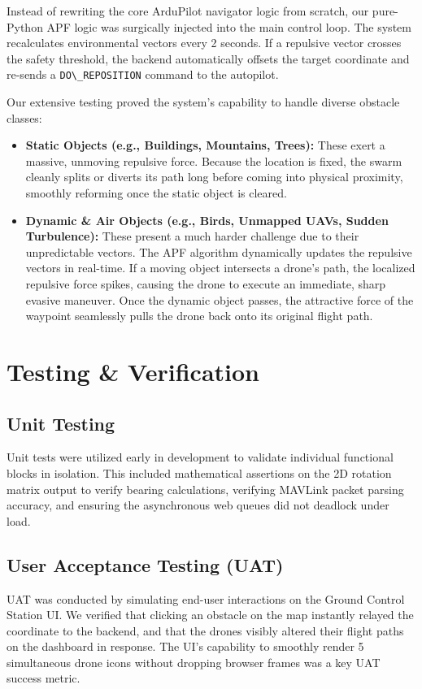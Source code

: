 \documentclass[11pt,a4paper]{article}
\newcommand{\code}[1]{\lstinline[basicstyle=\ttfamily\small,columns=fullflexible]|#1|}
\begin{document}
Instead of rewriting the core ArduPilot navigator logic from scratch, our pure-Python APF logic was surgically injected into the main control loop. The system recalculates environmental vectors every 2 seconds. If a repulsive vector crosses the safety threshold, the backend automatically offsets the target coordinate and re-sends a \code{DO\_REPOSITION} command to the autopilot. 

Our extensive testing proved the system's capability to handle diverse obstacle classes:
\begin{itemize}[leftmargin=1.5em]
    \item \textbf{Static Objects (e.g., Buildings, Mountains, Trees):} These exert a massive, unmoving repulsive force. Because the location is fixed, the swarm cleanly splits or diverts its path long before coming into physical proximity, smoothly reforming once the static object is cleared.
    \item \textbf{Dynamic \& Air Objects (e.g., Birds, Unmapped UAVs, Sudden Turbulence):} These present a much harder challenge due to their unpredictable vectors. The APF algorithm dynamically updates the repulsive vectors in real-time. If a moving object intersects a drone's path, the localized repulsive force spikes, causing the drone to execute an immediate, sharp evasive maneuver. Once the dynamic object passes, the attractive force of the waypoint seamlessly pulls the drone back onto its original flight path.
\end{itemize}

\section{Testing \& Verification}

\subsection{Unit Testing}
Unit tests were utilized early in development to validate individual functional blocks in isolation. This included mathematical assertions on the 2D rotation matrix output to verify bearing calculations, verifying MAVLink packet parsing accuracy, and ensuring the asynchronous web queues did not deadlock under load.

\subsection{User Acceptance Testing (UAT)}
UAT was conducted by simulating end-user interactions on the Ground Control Station UI. We verified that clicking an obstacle on the map instantly relayed the coordinate to the backend, and that the drones visibly altered their flight paths on the dashboard in response. The UI's capability to smoothly render 5 simultaneous drone icons without dropping browser frames was a key UAT success metric.
\end{document}
